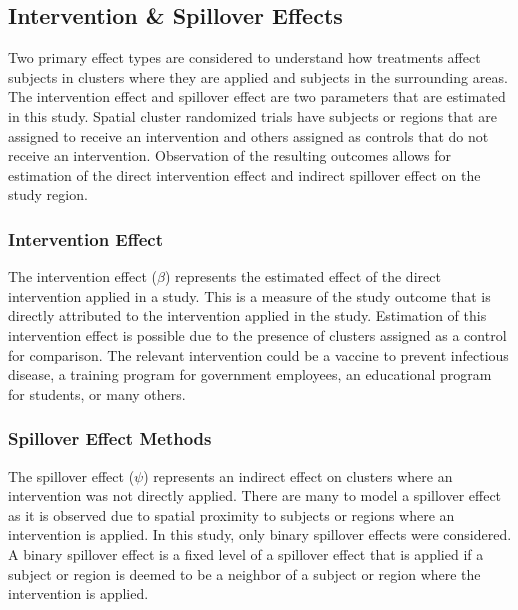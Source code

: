\documentclass{article}[11pt]
\begin{document}
\subsection{Intervention \& Spillover Effects}

Two primary effect types are considered to understand how treatments affect subjects in clusters where they are applied and subjects in the surrounding areas. The intervention effect and spillover effect are two parameters that are estimated in this study. Spatial cluster randomized trials have subjects or regions that are assigned to receive an intervention and others assigned as controls that do not receive an intervention. Observation of the resulting outcomes allows for estimation of the direct intervention effect and indirect spillover effect on the study region.

\subsubsection{Intervention Effect}\label{Section:InterventionEffect}

The intervention effect ($\beta$) represents the estimated effect of the direct intervention applied in a study. This is a measure of the study outcome that is directly attributed to the intervention applied in the study. Estimation of this intervention effect is possible due to the presence of clusters assigned as a control for comparison. The relevant intervention could be a vaccine to prevent infectious disease, a training program for government employees, an educational program for students, or many others. 


\subsubsection{Spillover Effect Methods}\label{Section:SpilloverEffectMethods}

The spillover effect ($\psi$) represents an indirect effect on clusters where an intervention was not directly applied\cite{benjamin-chung_spillover_2017}\cite{benjamin-chung_extension_2024}. There are many to model a spillover effect as it is observed due to spatial proximity to subjects or regions where an intervention is applied. In this study, only binary spillover effects were considered. A binary spillover effect is a fixed level of a spillover effect that is applied if a subject or region is deemed to be a neighbor of a subject or region where the intervention is applied. 
\end{document}
